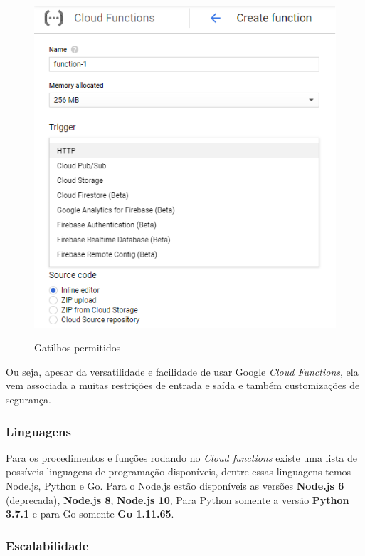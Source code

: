 \begin{figure}[ht]
	\centering
	\caption{Gatilhos permitidos}

	\includegraphics[width=12.5cm]{figuras/google-cloud-functions/triggers.png}
	\label{fig:google-cloud-functions-triggers}
\end{figure}

\bigskip
Ou seja, apesar da versatilidade e facilidade de usar Google \textit{Cloud Functions}, ela vem associada a muitas restrições de entrada e saída e também customizações de segurança.

\subsubsection{Linguagens}

Para os procedimentos e funções rodando no \textit{Cloud functions} existe uma lista de possíveis linguagens de programação disponíveis, dentre essas linguagens temos Node.js, Python e Go.
Para o Node.js estão disponíveis as versões \textbf{Node.js 6} (deprecada), \textbf{Node.js 8}, \textbf{Node.js 10}, Para Python somente a versão \textbf{Python 3.7.1} e para Go somente \textbf{Go 1.11.65}.

\subsubsection{Escalabilidade}

